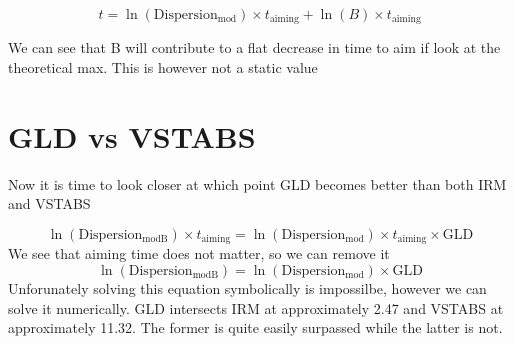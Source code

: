 \documentclass{article}
\begin{document}
\[t = \ln \left( \mathrm{Dispersion_{mod}} \right) \times t_{\mathrm{aiming}} + \ln \left( B \right) \times t_{\mathrm{aiming}} \]

We can see that B will contribute to a flat decrease in time to aim if look at the theoretical max.
This is however not a static value

\section{GLD vs VSTABS}
Now it is time to look closer at which point GLD becomes better than both IRM and VSTABS

\[ \ln \left(\mathrm{Dispersion_{modB}}\right) \times t_{\mathrm{aiming}} = \ln \left(\mathrm{Dispersion_{mod}}\right) \times t_{\mathrm{aiming}} \times \mathrm{GLD}\]
We see that aiming time does not matter, so we can remove it
\[ \ln \left(\mathrm{Dispersion_{modB}}\right) = \ln \left(\mathrm{Dispersion_{mod}}\right) \times \mathrm{GLD}\]
Unforunately solving this equation symbolically is impossilbe, however we can solve it numerically.
GLD intersects IRM at approximately 2.47 and VSTABS at approximately 11.32. The former is quite easily surpassed while the latter is not.














\end{document}
